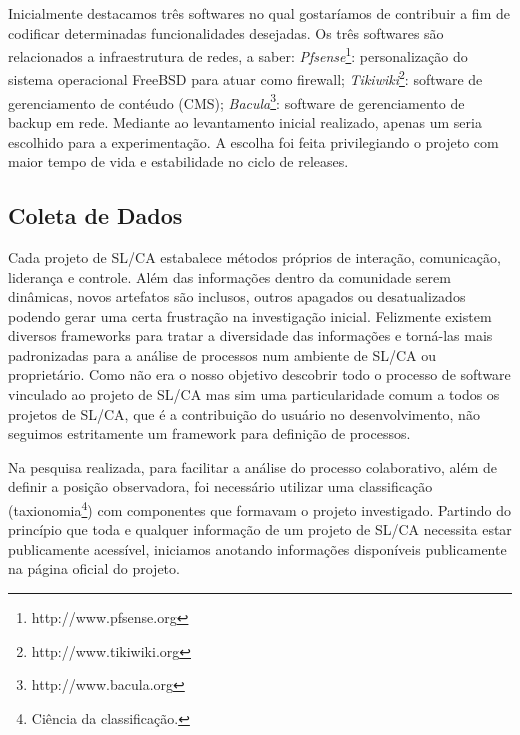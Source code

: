 Inicialmente destacamos três softwares no qual gostaríamos de contribuir a fim de codificar determinadas funcionalidades desejadas. Os três softwares são relacionados a infraestrutura de redes, a saber: \textit{Pfsense}\footnote{http://www.pfsense.org}: personalização do sistema operacional FreeBSD para atuar como firewall; \textit{Tikiwiki}\footnote{http://www.tikiwiki.org}: software de gerenciamento de contéudo (CMS); \textit{Bacula}\footnote{http://www.bacula.org}: software de gerenciamento de backup em rede. Mediante ao levantamento inicial realizado, apenas um seria escolhido para a experimentação. A escolha foi feita privilegiando o projeto com maior tempo de vida e estabilidade no ciclo de releases.

\subsection{Coleta de Dados} \label{subsection:coletadados}

Cada projeto de SL/CA estabalece métodos próprios de interação, comunicação, liderança e controle. Além das informações dentro da comunidade serem dinâmicas, novos artefatos são inclusos, outros apagados ou desatualizados podendo gerar uma certa frustração na investigação inicial. Felizmente existem diversos frameworks \cite{reference} para tratar a diversidade das informações e torná-las mais padronizadas para a análise de processos num ambiente de SL/CA ou proprietário. Como não era o nosso objetivo descobrir todo o processo de software vinculado ao projeto de SL/CA mas sim uma particularidade comum a todos os projetos de SL/CA, que é a contribuição do usuário no desenvolvimento, não seguimos estritamente um framework para definição de processos.

Na pesquisa realizada, para facilitar a análise do processo colaborativo, além de definir a posição observadora, foi necessário utilizar uma classificação (taxionomia\footnote{Ciência da classificação.}) com componentes que formavam o projeto investigado. Partindo do princípio que toda e qualquer informação de um projeto de SL/CA necessita estar publicamente acessível, iniciamos anotando informações disponíveis publicamente na página oficial do projeto. 

